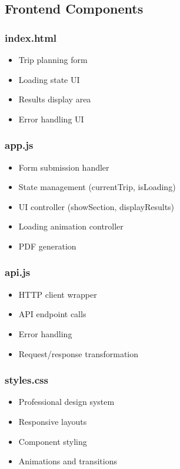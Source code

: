 \documentclass[12pt,a4paper]{report}
\begin{document}
\subsection{Frontend Components}

\subsubsection{index.html}
\begin{itemize}
    \item Trip planning form
    \item Loading state UI
    \item Results display area
    \item Error handling UI
\end{itemize}

\subsubsection{app.js}
\begin{itemize}
    \item Form submission handler
    \item State management (currentTrip, isLoading)
    \item UI controller (showSection, displayResults)
    \item Loading animation controller
    \item PDF generation
\end{itemize}

\subsubsection{api.js}
\begin{itemize}
    \item HTTP client wrapper
    \item API endpoint calls
    \item Error handling
    \item Request/response transformation
\end{itemize}

\subsubsection{styles.css}
\begin{itemize}
    \item Professional design system
    \item Responsive layouts
    \item Component styling
    \item Animations and transitions
\end{itemize}
\end{document}

